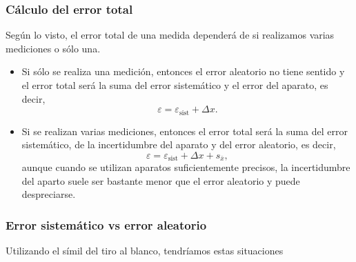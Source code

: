 \begin{frame}
\frametitle{Cálculo del error total}
Según lo visto, el error total de una medida dependerá de si realizamos varias mediciones o sólo una.

\begin{itemize}
\item {} Si sólo se realiza una medición, entonces el error aleatorio no tiene sentido y
el error total será la suma del error sistemático y el error del aparato, es decir,
\[
\varepsilon = \varepsilon_{\textrm{sist}}+\Delta x.
\]
\item {} Si se realizan varias mediciones, entonces el error total será la suma del
error sistemático, de la incertidumbre del aparato y del error aleatorio, es decir,
\[
\varepsilon = \varepsilon_{\textrm{sist}}+\Delta x+s_{\bar x},
\]
aunque cuando se utilizan aparatos suficientemente precisos, la incertidumbre del aparto suele ser bastante menor que
el error aleatorio y puede despreciarse.
\end{itemize} 
\end{frame}


\begin{frame}
\frametitle{Error sistemático vs error aleatorio}
Utilizando el símil del tiro al blanco, tendríamos estas situaciones
\begin{center}
\scalebox{1}{}
\end{center}
\end{frame}



